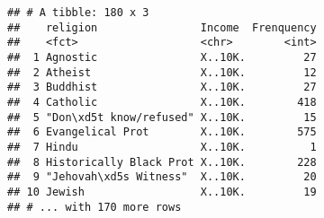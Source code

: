 \documentclass[]{article}
\newenvironment{Shaded}{\begin{snugshade}}{\end{snugshade}}
\newcommand{\KeywordTok}[1]{\textcolor[rgb]{0.13,0.29,0.53}{\textbf{#1}}}
\newcommand{\DataTypeTok}[1]{\textcolor[rgb]{0.13,0.29,0.53}{#1}}
\newcommand{\StringTok}[1]{\textcolor[rgb]{0.31,0.60,0.02}{#1}}
\newcommand{\CommentTok}[1]{\textcolor[rgb]{0.56,0.35,0.01}{\textit{#1}}}
\newcommand{\OperatorTok}[1]{\textcolor[rgb]{0.81,0.36,0.00}{\textbf{#1}}}
\newcommand{\NormalTok}[1]{#1}
\begin{document}
\begin{Shaded}
\end{Shaded}

\begin{verbatim}
## # A tibble: 180 x 3
##    religion                Income  Frenquency
##    <fct>                   <chr>        <int>
##  1 Agnostic                X..10K.         27
##  2 Atheist                 X..10K.         12
##  3 Buddhist                X..10K.         27
##  4 Catholic                X..10K.        418
##  5 "Don\xd5t know/refused" X..10K.         15
##  6 Evangelical Prot        X..10K.        575
##  7 Hindu                   X..10K.          1
##  8 Historically Black Prot X..10K.        228
##  9 "Jehovah\xd5s Witness"  X..10K.         20
## 10 Jewish                  X..10K.         19
## # ... with 170 more rows
\end{verbatim}
\end{document}
